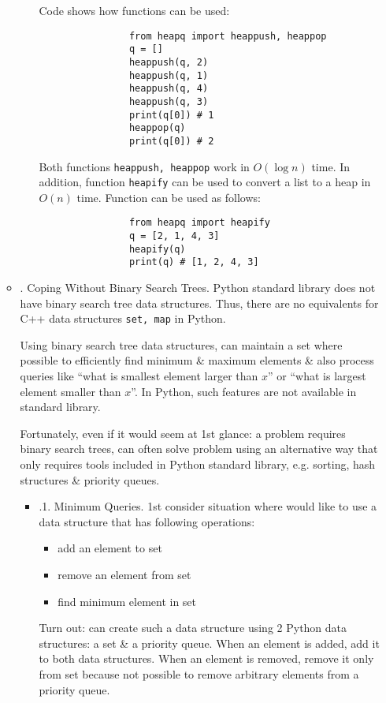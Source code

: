 \documentclass{article}
\begin{document}
\begin{itemize}
\begin{itemize}
\begin{itemize}
			Code shows how functions can be used:
			\begin{verbatim}
				from heapq import heappush, heappop
				q = []
				heappush(q, 2)
				heappush(q, 1)
				heappush(q, 4)
				heappush(q, 3)
				print(q[0]) # 1
				heappop(q)
				print(q[0]) # 2
			\end{verbatim}
			Both functions {\tt heappush, heappop} work in $O(\log n)$ time. In addition, function {\tt heapify} can be used to convert a list to a heap in $O(n)$ time. Function can be used as follows:
			\begin{verbatim}
				from heapq import heapify
				q = [2, 1, 4, 3]
				heapify(q)
				print(q) # [1, 2, 4, 3]
			\end{verbatim}
		\end{itemize}
		\item {. Coping Without Binary Search Trees.} Python standard library does not have binary search tree data structures. Thus, there are no equivalents for C++ data structures {\tt set, map} in Python.
		
		Using binary search tree data structures, can maintain a set where possible to efficiently find minimum \& maximum elements \& also process queries like ``what is smallest element larger than $x$'' or ``what is largest element smaller than $x$''. In Python, such features are not available in standard library.
		
		Fortunately, even if it would seem at 1st glance: a problem requires binary search trees, can often solve problem using an alternative way that only requires tools included in Python standard library, e.g. sorting, hash structures \& priority queues.
		\begin{itemize}
			\item {.1. Minimum Queries.} 1st consider situation where would like to use a data structure that has following operations:
			\begin{itemize}
				\item add an element to set
				\item remove an element from set
				\item find minimum element in set
			\end{itemize}
			Turn out: can create such a data structure using 2 Python data structures: a set \& a priority queue. When an element is added, add it to both data structures. When an element is removed, remove it only from set because not possible to remove arbitrary elements from a priority queue.
			

\end{itemize}
\end{itemize}
\end{itemize}
\end{document}
